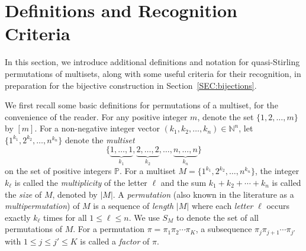 \documentclass[11pt]{article}
\numberwithin{equation}{section}
\def\bN{\mathbb N}
\def\bP{\mathbb P}
\begin{document}
\section{Definitions and Recognition Criteria}\label{SEC:pre}

In this section, we introduce additional definitions and notation for quasi-Stirling permutations of multisets, along with some useful criteria for their recognition, in preparation for the bijective construction in Section~\ref{SEC:bijections}.
 
We first recall some basic definitions for permutations of a multiset, for the convenience of the reader. For any positive integer $m$, denote the set $\{1,2,\ldots,m\}$ by $[m]$. 
For a non-negative integer vector $(k_1,k_2,\ldots,k_n)\in\bN^n$, let $\{1^{k_1},2^{k_2},\ldots,n^{k_n}\}$ denote the \textit{multiset} $$\{\underbrace{1,\ldots,1}_{k_1},\underbrace{2,\ldots,2}_{k_2},\ldots,\underbrace{n,\ldots,n}_{k_n}\}$$ on the set of positive integers $\bP$. For a multiset $M=\{1^{k_1},2^{k_2},\ldots,n^{k_n}\}$, the integer $k_\ell$ is called the \textit{multiplicity} of the letter $\ell$ and the sum $k_1+k_2+\cdots+k_n$ is called the \textit{size} of $M$, denoted by $|M|$. A \textit{permutation} (also known in the literature as a \textit{multipermutation}) of $M$ is a sequence of \textit{length} $|M|$ where each \textit{letter} $\ell$ occurs exactly $k_\ell$ times for all $1\leq \ell\leq n$. We use $S_M$ to denote the set of all permutations of $M$. For a permutation $\pi = \pi_1 \pi_2 \cdots \pi_K$, a subsequence $\pi_j \pi_{j+1} \cdots \pi_{j'}$ with $1 \le j \le j' \le K$ is called a \emph{factor} of $\pi$. 



\end{document}
